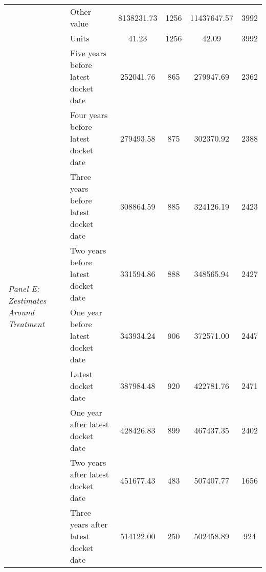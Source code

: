 \begin{tabular}{llcccc}
 & Other value & 8138231.73 & 1256 & 11437647.57 & 3992 \\
 & Units & 41.23 & 1256 & 42.09 & 3992 \\
\cline{1-6}
\multirow[c]{9}{4cm}{\textit{Panel E: Zestimates Around Treatment}} & Five years before latest docket date & 252041.76 & 865 & 279947.69 & 2362 \\
 & Four years before latest docket date & 279493.58 & 875 & 302370.92 & 2388 \\
 & Three years before latest docket date & 308864.59 & 885 & 324126.19 & 2423 \\
 & Two years before latest docket date & 331594.86 & 888 & 348565.94 & 2427 \\
 & One year before latest docket date & 343934.24 & 906 & 372571.00 & 2447 \\
 & Latest docket date & 387984.48 & 920 & 422781.76 & 2471 \\
 & One year after latest docket date & 428426.83 & 899 & 467437.35 & 2402 \\
 & Two years after latest docket date & 451677.43 & 483 & 507407.77 & 1656 \\
 & Three years after latest docket date & 514122.00 & 250 & 502458.89 & 924 \\
\cline{1-6}
\bottomrule
\end{tabular}
